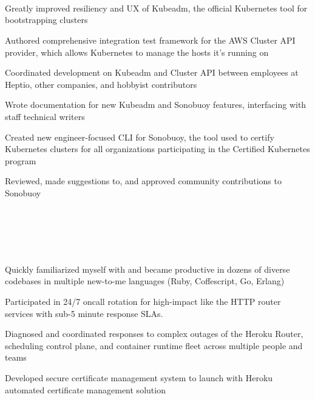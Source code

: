 \documentclass[letterpaper,11pt,notitlepage]{article}
\begin{document}

\vbar
{}
         \\
         \\
         \\
        \begin{employment}
          \item Greatly improved resiliency and UX of Kubeadm, the official Kubernetes tool
            for bootstrapping clusters
          \item Authored comprehensive integration test framework for the
            AWS Cluster API provider, which allows Kubernetes to manage the hosts it's running on
          \item Coordinated development on Kubeadm and Cluster API between
            employees at Heptio, other companies, and hobbyist contributors
          \item Wrote documentation for new Kubeadm and Sonobuoy features,
            interfacing with staff technical writers
          \item Created new engineer-focused CLI for Sonobuoy, the tool used to certify Kubernetes clusters
                for all organizations participating in the Certified Kubernetes program
          \item Reviewed, made suggestions to, and approved community contributions to Sonobuoy
        \end{employment}
         \\
         \\
         \\
         \\
        \begin{employment}
            \item Quickly familiarized myself with and became productive in
              dozens of diverse codebases in multiple new-to-me languages (Ruby,
              Coffescript, Go, Erlang)
            \item Participated in 24/7 oncall rotation for high-impact like the HTTP router
              services with sub-5 minute response SLAs.
            \item Diagnosed and coordinated responses to complex outages of the
              Heroku Router, scheduling control plane, and container runtime
              fleet across multiple people and teams
            \item Developed secure certificate management system to launch with
              Heroku automated certificate management solution
        \end{employment}
\end{document}

